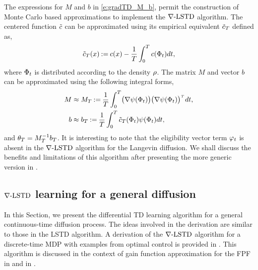 The expressions for $M$ and $b$ in \eqref{e:gradTD_M_b}, permit the construction of Monte Carlo based approximations to implement the $\nabla\text{-LSTD}$ algorithm. The centered function $\tilde c$ can be approximated using its empirical equivalent $\tilde c_T$ defined as,
\begin{equation}
\tilde c_T(x) \mathbin{:=} c(x) - \frac{1}{T} \int_0^T c(\Phi_t) dt,
\end{equation}
where $\Phi_t$ is distributed according to the density $\rho$. The matrix $M$ and vector $b$ can be approximated using the following integral forms,
\begin{align}
M &\approx M_T \eqdef \frac{1}{T}\int_0^T\bigl(\gradbasis (\markovstate_t)\bigr)\bigl(\gradbasis (\markovstate_t)\bigr)^{\transpose}\, dt, \\
b &\approx b_T \eqdef \frac{1}{T} \int_0^T \tilc_T(\markovstate_t) \basis(\markovstate_t) dt,
\label{e:gradTD_M_b_int}
\end{align}
and $\theta_T = M_T^{-1} b_T$. 
It is interesting to note that the eligibility vector term $\varphi_t$ is absent in the $\nabla\text{-LSTD}$ algorithm for the Langevin diffusion. We shall discuss the benefits and limitations of this algorithm after presenting the more generic version in . 
 
\subsection{$\nabla\text{-LSTD}$ learning for a general diffusion}
\label{s:diff_td_learning}
In this Section, we present the differential TD learning algorithm for a general continuous-time diffusion process. 
The ideas involved in the derivation are similar to those in the LSTD algorithm.  A derivation of the $\nabla\text{-LSTD}$ algorithm for a discrete-time MDP with examples from optimal control is provided in \cite{devmey16arXiv}. This algorithm is discussed in the context of gain function approximation for the FPF in  and in \cite{raddevmey16}. 

